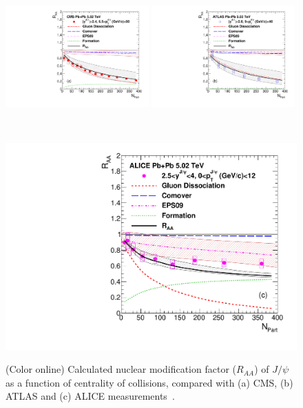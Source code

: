 \documentclass[12pt,a4paper,final]{iopart} %
\newcommand{\Jpsi}{J/\psi}
\begin{document}
\begin{figure}
\begin{minipage}{1.0\linewidth}
\centering
{\includegraphics[width=0.49\textwidth]{Fig5a_CMS_RAANPart_Shade.pdf}}
{\includegraphics[width=0.49\textwidth]{Fig5b_ATLAS_RAANPart_Shade.pdf}}
\end{minipage}%
\ \\
\centering
\begin{minipage}{0.5\linewidth}
\centering
{\includegraphics[width=1.0\textwidth]{Fig5c_ALICE_RAANPart_Shade.pdf}}
\end{minipage}%
\caption{(Color online) Calculated nuclear modification factor ($R_{AA}$) of $\Jpsi$ as a function
  of centrality of collisions, compared with (a) CMS, (b) ATLAS and (c) ALICE
  measurements~\cite{Sirunyan:2017isk,ATLAS:2016qpn,Adam:2016rdg}.}
\label{fig:JPsiRaaVsNPart}
\end{figure}
\end{document}
